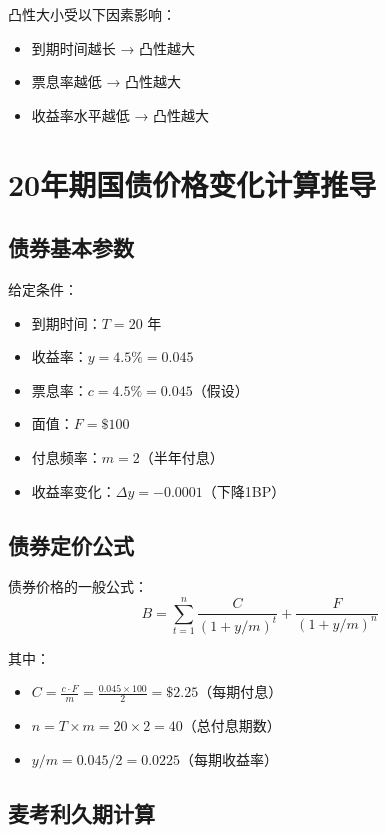 凸性大小受以下因素影响：
\begin{itemize}
    \item 到期时间越长 → 凸性越大
    \item 票息率越低 → 凸性越大
    \item 收益率水平越低 → 凸性越大
\end{itemize}

\section{20年期国债价格变化计算推导}

\subsection{债券基本参数}

给定条件：
\begin{itemize}
    \item 到期时间：$T = 20$ 年
    \item 收益率：$y = 4.5\% = 0.045$
    \item 票息率：$c = 4.5\% = 0.045$（假设）
    \item 面值：$F = \$100$
    \item 付息频率：$m = 2$（半年付息）
    \item 收益率变化：$\Delta y = -0.0001$（下降1BP）
\end{itemize}

\subsection{债券定价公式}

债券价格的一般公式：
\begin{equation}
B = \sum_{t=1}^{n} \frac{C}{(1+y/m)^t} + \frac{F}{(1+y/m)^n}
\end{equation}

其中：
\begin{itemize}
    \item $C = \frac{c \cdot F}{m} = \frac{0.045 \times 100}{2} = \$2.25$（每期付息）
    \item $n = T \times m = 20 \times 2 = 40$（总付息期数）
    \item $y/m = 0.045/2 = 0.0225$（每期收益率）
\end{itemize}

\subsection{麦考利久期计算}

